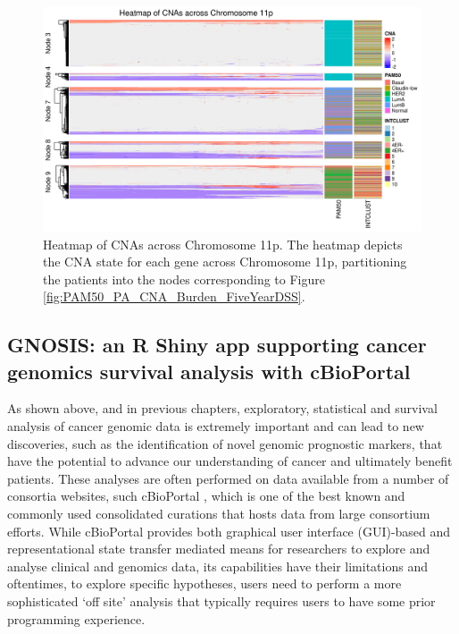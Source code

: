 \vfill 

\begin{figure}[H]
  \centering
  \includegraphics[width=1\textwidth]{../figures/Chapter_3/PA_PartyKit_Survival_Burden_FiveYearDSS_PAM50.png_11p_All_Heatmap.png}
  \caption[Heatmap of CNAs across Chromosome 11p]{Heatmap of CNAs across Chromosome 11p. The heatmap depicts the CNA state for each gene across Chromosome 11p, partitioning the patients into the nodes corresponding to Figure \ref{fig:PAM50_PA_CNA_Burden_FiveYearDSS}.}
  \label{PA_SurvTrees_Burden_Heatmaps_11p}
\end{figure}

\subsection{GNOSIS: an R Shiny app supporting cancer genomics survival analysis with cBioPortal}
As shown above, and in previous chapters, exploratory, statistical and survival analysis of cancer genomic data is extremely important and can lead to new discoveries, such as the identification of novel genomic prognostic markers, that have the potential to advance our understanding of cancer and ultimately benefit patients. These analyses are often performed on data available from a number of consortia websites, such cBioPortal \citep{pmid22588877, pmid23550210}, which is one of the best known and commonly used consolidated curations that hosts data from large consortium efforts. While cBioPortal provides both graphical user interface (GUI)-based and representational state transfer mediated means for researchers to explore and analyse clinical and genomics data, its capabilities have their limitations and oftentimes, to explore specific hypotheses, users need to perform a more sophisticated ‘off site’ analysis that typically requires users to have some prior programming experience. 

